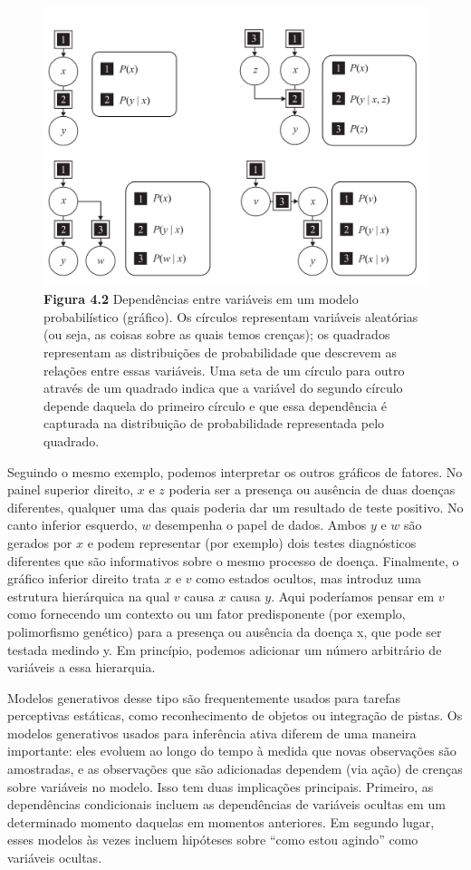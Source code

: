 \documentclass[
  12pt,
]{book}
\begin{document}
\begin{figure}
\centering
\includegraphics{images/Figura_4_2.png}
\caption{\textbf{Figura 4.2} Dependências entre variáveis em um modelo
probabilístico (gráfico). Os círculos representam variáveis aleatórias
(ou seja, as coisas sobre as quais temos crenças); os quadrados
representam as distribuições de probabilidade que descrevem as relações
entre essas variáveis. Uma seta de um círculo para outro através de um
quadrado indica que a variável do segundo círculo depende daquela do
primeiro círculo e que essa dependência é capturada na distribuição de
probabilidade representada pelo quadrado.}
\end{figure}

Seguindo o mesmo exemplo, podemos interpretar os outros gráficos de
fatores. No painel superior direito, \(x\) e \(z\) poderia ser a presença ou
ausência de duas doenças diferentes, qualquer uma das quais poderia dar
um resultado de teste positivo. No canto inferior esquerdo, \(w\)
desempenha o papel de dados. Ambos \(y\) e \(w\) são gerados por \(x\) e podem
representar (por exemplo) dois testes diagnósticos diferentes que são
informativos sobre o mesmo processo de doença. Finalmente, o gráfico
inferior direito trata \(x\) e \(v\) como estados ocultos, mas introduz uma
estrutura hierárquica na qual \(v\) causa \(x\) causa \(y\). Aqui poderíamos
pensar em \(v\) como fornecendo um contexto ou um fator predisponente (por
exemplo, polimorfismo genético) para a presença ou ausência da doença x,
que pode ser testada medindo y. Em princípio, podemos adicionar um
número arbitrário de variáveis a essa hierarquia.

Modelos generativos desse tipo são frequentemente usados para tarefas
perceptivas estáticas, como reconhecimento de objetos ou integração de
pistas. Os modelos generativos usados para inferência ativa diferem de
uma maneira importante: eles evoluem ao longo do tempo à medida que
novas observações são amostradas, e as observações que são adicionadas
dependem (via ação) de crenças sobre variáveis no modelo. Isso tem duas
implicações principais. Primeiro, as dependências condicionais incluem
as dependências de variáveis ocultas em um determinado momento daquelas
em momentos anteriores. Em segundo lugar, esses modelos às vezes incluem
hipóteses sobre ``como estou agindo'' como variáveis ocultas.
\end{document}
